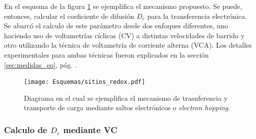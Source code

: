 	    	 En el esquema de la figura \ref{fig:sitios_redox} se ejemplifica el mecanismo propuesto. Se puede, entonces, calcular el coeficiente de difusión $D_e$ para la transferencia electrónica. Se abarcó el calculo de este parámetro desde dos enfoques diferentes, uno haciendo uso de voltametrías cíclicas (CV) a distintas velocidades de barrido y otro utilizando la técnica de voltametría de corriente alterna (VCA). Los detalles experimentales para ambas técnicas fueron explicados en la sección \ref{sec:medidas_eq}, pág. \pageref{sec:medidas_eq}.
			\begin{figure}[ht!]
					\centering
			 	    \texttt{[image: Esquemas/sitios\_redox.pdf]}
			        \caption[Mecanismo de transferencia de electrones]{Diagrama en el cual se ejemplifica el mecanismo de trasnferencia y transporte de carga mediante saltos electrónicos o \textit{electron hopping.}}
			        \label{fig:sitios_redox}
			      	\end{figure} 

	 \subsubsection*{Calculo de $D_e$ mediante VC}	
	 
